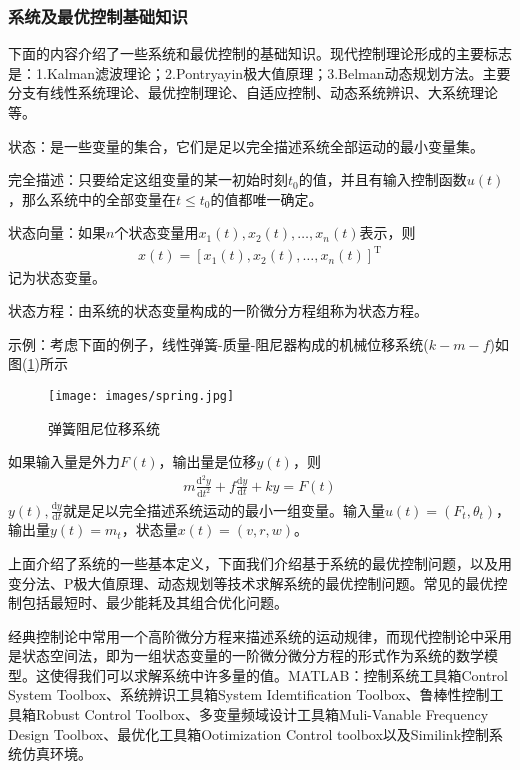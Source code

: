         \subsubsection{系统及最优控制基础知识}
            \par
            下面的内容介绍了一些系统和最优控制的基础知识。现代控制理论形成的主要标志是：1.Kalman滤波理论；2.Pontryayin极大值原理；3.Belman动态规划方法。主要分支有线性系统理论、最优控制理论、自适应控制、动态系统辨识、大系统理论等。
            \par
            状态：是一些变量的集合，它们是足以完全描述系统全部运动的最小变量集。
            \par
            完全描述：只要给定这组变量的某一初始时刻$t_0$的值，并且有输入控制函数$u(t)$，那么系统中的全部变量在$t \leqslant t_0$的值都唯一确定。
            \par
            状态向量：如果$n$个状态变量用$x_1(t),x_2(t),\dots,x_n(t)$表示，则
            \begin{align*}
            x(t) = [x_1(t),x_2(t),\dots,x_n(t)]^\mathrm{T}
            \end{align*}
            记为状态变量。
            \par
            状态方程：由系统的状态变量构成的一阶微分方程组称为状态方程。
            \par
            示例：考虑下面的例子，线性弹簧-质量-阻尼器构成的机械位移系统($k-m-f$)如图(\ref{fig:弹簧阻尼位移系统})所示
            \begin{figure}[H]
            \centering
            \texttt{[image: images/spring.jpg]}
            \caption{弹簧阻尼位移系统}
            \label{fig:弹簧阻尼位移系统}
            \end{figure}
            如果输入量是外力$F(t)$，输出量是位移$y(t)$，则
            \begin{align*}
            m\frac{\mathrm{d}^2y}{\mathrm{d}t^2} + f\frac{\mathrm{d}y}{\mathrm{d}t} + ky =F(t)
            \end{align*}
            $y(t),\frac{\mathrm{d}y}{\mathrm{d}t}$就是足以完全描述系统运动的最小一组变量。输入量$u(t)= (F_t,\theta_t)$，输出量$y(t) = m_t$，状态量$x(t) = (v,r,w)$。
            \par
            上面介绍了系统的一些基本定义，下面我们介绍基于系统的最优控制问题，以及用变分法、P极大值原理、动态规划等技术求解系统的最优控制问题。常见的最优控制包括最短时、最少能耗及其组合优化问题。
            \par
            经典控制论中常用一个高阶微分方程来描述系统的运动规律，而现代控制论中采用是状态空间法，即为一组状态变量的一阶微分微分方程的形式作为系统的数学模型。这使得我们可以求解系统中许多量的值。MATLAB：控制系统工具箱Control System Toolbox、系统辨识工具箱System Idemtification Toolbox、鲁棒性控制工具箱Robust Control Toolbox、多变量频域设计工具箱Muli-Vanable Frequency Design Toolbox、最优化工具箱Ootimization Control toolbox以及Similink控制系统仿真环境。
